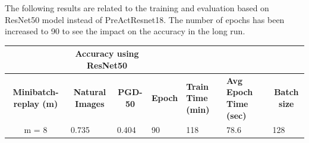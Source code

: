 \documentclass{article}
\begin{document}
The following results are related to the training and evaluation based on
ResNet50 model instead of PreActResnet18. The number of epochs has been
increased to 90 to see the impact on the accuracy in the long run. 




\begin{table}[hbt!]
\centering
\begin{tabular}{|c|c|l|l|l|l|l|}
\hline
\multicolumn{1}{|l|}{}        & \multicolumn{2}{c|}{\textbf{Accuracy using
ResNet50}}                               & \multicolumn{3}{l|}{\textbf{}}
& \textbf{}                                \\ \hline
\textbf{Minibatch-replay (m)} & \textbf{Natural Images}                      &
\multicolumn{1}{c|}{\textbf{PGD-50}} & \multicolumn{1}{c|}{\textbf{Epoch}} &
\multicolumn{1}{p{1.5cm}|}{\textbf{Train Time (min)}} &
\multicolumn{1}{p{1.5cm}|}{\textbf{Avg Epoch Time (sec)}} &
\multicolumn{1}{c|}{\textbf{Batch size}} \\ \hline
m = 8       & \multicolumn{1}{l|}{0.735} & { 0.404}         & { 90}           &
{ 118}                     & { 78.6}                        & { 128}
\\ \hline
\end{tabular}
\end{table}

\newpage
\end{document}
